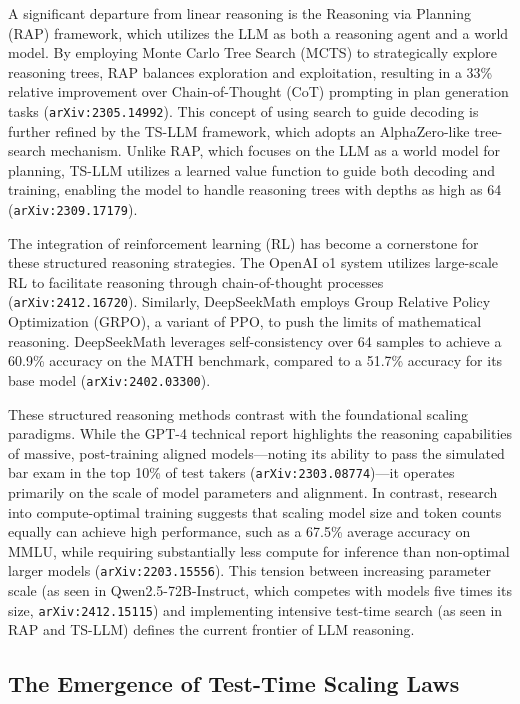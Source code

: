 \documentclass[11pt]{article}
\begin{document}
A significant departure from linear reasoning is the Reasoning via Planning (RAP) framework, which utilizes the LLM as both a reasoning agent and a world model. By employing Monte Carlo Tree Search (MCTS) to strategically explore reasoning trees, RAP balances exploration and exploitation, resulting in a 33\% relative improvement over Chain-of-Thought (CoT) prompting in plan generation tasks (\texttt{arXiv:2305.14992}). This concept of using search to guide decoding is further refined by the TS-LLM framework, which adopts an AlphaZero-like tree-search mechanism. Unlike RAP, which focuses on the LLM as a world model for planning, TS-LLM utilizes a learned value function to guide both decoding and training, enabling the model to handle reasoning trees with depths as high as 64 (\texttt{arXiv:2309.17179}).

The integration of reinforcement learning (RL) has become a cornerstone for these structured reasoning strategies. The OpenAI o1 system utilizes large-scale RL to facilitate reasoning through chain-of-thought processes (\texttt{arXiv:2412.16720}). Similarly, DeepSeekMath employs Group Relative Policy Optimization (GRPO), a variant of PPO, to push the limits of mathematical reasoning. DeepSeekMath leverages self-consistency over 64 samples to achieve a 60.9\% accuracy on the MATH benchmark, compared to a 51.7\% accuracy for its base model (\texttt{arXiv:2402.03300}).

These structured reasoning methods contrast with the foundational scaling paradigms. While the GPT-4 technical report highlights the reasoning capabilities of massive, post-training aligned models—noting its ability to pass the simulated bar exam in the top 10\% of test takers (\texttt{arXiv:2303.08774})—it operates primarily on the scale of model parameters and alignment. In contrast, research into compute-optimal training suggests that scaling model size and token counts equally can achieve high performance, such as a 67.5\% average accuracy on MMLU, while requiring substantially less compute for inference than non-optimal larger models (\texttt{arXiv:2203.15556}). This tension between increasing parameter scale (as seen in Qwen2.5-72B-Instruct, which competes with models five times its size, \texttt{arXiv:2412.15115}) and implementing intensive test-time search (as seen in RAP and TS-LLM) defines the current frontier of LLM reasoning.

\subsection{The Emergence of Test-Time Scaling Laws}
\end{document}
